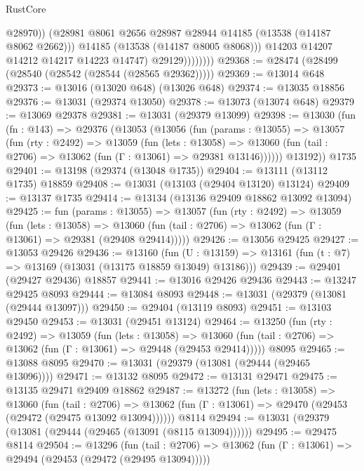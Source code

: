 \begin{lexlean}{RustCore}
\begin{coremodule}
                            @28970))
                        (@28981 @8061 @2656 @28987 @28944 @14185 (@13538 (@14187 @8062 @2662)))
                        @14185
                        (@13538 (@14187 @8005 @8068)))
                      @14203
                      @14207
                      @14212
                      @14217
                      @14223
                      @14747)
                    @29129))))))))
@29368 := @28474 (@28499 (@28540 (@28542 (@28544 (@28565 @29362)))))
@29369 := @13014 @648
@29373 := @13016 (@13020 @648) (@13026 @648)
@29374 := @13035 @18856
@29376 := @13031 (@29374 @13050)
@29378 := @13073 (@13074 @648)
@29379 := @13069 @29378
@29381 := @13031 (@29379 @13099)
@29398 := @13030
    (fun (fn : @143) =>
    @29376
      (@13053
        (@13056
          (fun (params : @13055) =>
          @13057
            (fun (rty : @2492) =>
            @13059
              (fun (lets : @13058) =>
              @13060 (fun (tail : @2706) => @13062 (fun (Γ : @13061) => @29381 @13146))))))
        @13192))
    @1735
@29401 := @13198 (@29374 (@13048 @1735))
@29404 := @13111 (@13112 @1735) @18859
@29408 := @13031 (@13103 (@29404 @13120) @13124)
@29409 := @13137 @1735
@29414 := @13134 (@13136 @29409 @18862 @13092 @13094)
@29425 := fun (params : @13055) =>
  @13057
    (fun (rty : @2492) =>
    @13059
      (fun (lets : @13058) =>
      @13060 (fun (tail : @2706) => @13062 (fun (Γ : @13061) => @29381 (@29408 @29414)))))
@29426 := @13056 @29425
@29427 := @13053 @29426
@29436 := @13160
    (fun (U : @13159) => @13161 (fun (t : @7) => @13169 (@13031 (@13175 @18859 @13049) @13186)))
@29439 := @29401 (@29427 @29436) @18857
@29441 := @13016 @29426 @29436
@29443 := @13247 @29425 @8093
@29444 := @13084 @8093
@29448 := @13031 (@29379 (@13081 (@29444 @13097)))
@29450 := @29404 (@13119 @8093)
@29451 := @13103 @29450
@29453 := @13031 (@29451 @13124)
@29464 := @13250
    (fun (rty : @2492) =>
    @13059
      (fun (lets : @13058) =>
      @13060 (fun (tail : @2706) => @13062 (fun (Γ : @13061) => @29448 (@29453 @29414)))))
    @8095
@29465 := @13088 @8095
@29470 := @13031 (@29379 (@13081 (@29444 (@29465 @13096))))
@29471 := @13132 @8095
@29472 := @13131 @29471
@29475 := @13135 @29471 @29409 @18862
@29487 := @13272
    (fun (lets : @13058) =>
    @13060
      (fun (tail : @2706) =>
      @13062 (fun (Γ : @13061) => @29470 (@29453 (@29472 (@29475 @13092 @13094))))))
    @8114
@29494 := @13031 (@29379 (@13081 (@29444 (@29465 (@13091 (@8115 @13094))))))
@29495 := @29475 @8114
@29504 := @13296
    (fun (tail : @2706) => @13062 (fun (Γ : @13061) => @29494 (@29453 (@29472 (@29495 @13094)))))

\end{coremodule}
\end{lexlean}

